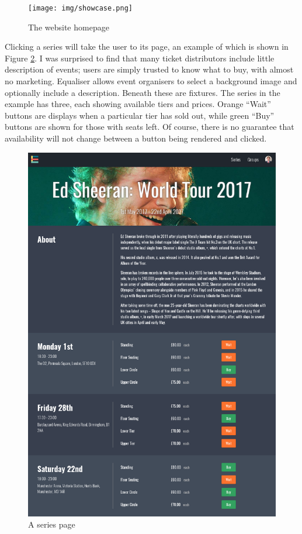 \documentclass[12pt,a4paper]{bhamdissertation}
\begin{document}
\begin{figure}[!htbp]
    \centering
    \texttt{[image: img/showcase.png]}
    \caption{The website homepage}
    \label{img:showcase}
\end{figure}

Clicking a series will take the user to its page, an example of which is shown in Figure \ref{img:series}. I was surprised to find that many ticket distributors include little description of events; users are simply trusted to know what to buy, with almost no marketing. Equaliser allows event organisers to select a background image and optionally include a description. Beneath these are fixtures. The series in the example has three, each showing available tiers and prices. Orange ``Wait'' buttons are displays when a particular tier has sold out, while green ``Buy'' buttons are shown for those with seats left. Of course, there is no guarantee that availability will not change between a button being rendered and clicked.

\begin{figure}[!htbp]
    \centering
    \includegraphics[width=1\linewidth]{img/series.png}
    \caption{A series page}
    \label{img:series}
\end{figure}
\end{document}
